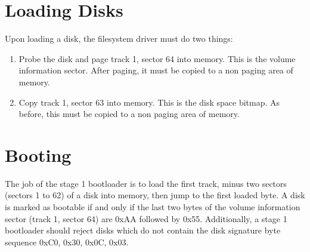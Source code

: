 \documentclass{article}
\begin{document}
\section{Loading Disks}

Upon loading a disk, the filesystem driver must do two things:

\begin{enumerate}
    \item Probe the disk and page track 1, sector 64 into memory. This is the volume information sector.
        After paging, it must be copied to a non paging area of memory.
    \item Copy track 1, sector 63 into memory. This is the disk space bitmap.
        As before, this must be copied to a non paging area of memory.
\end{enumerate}

\section{Booting}

The job of the stage 1 bootloader is to load the first track, minus two sectors (sectors 1 to 62) of a disk into memory, then jump to the first loaded byte.
A disk is marked as bootable if and only if the last two bytes of the volume information sector (track 1, sector 64) are 0xAA followed by 0x55. Additionally, a stage 1 bootloader should
reject disks which do not contain the disk signature byte sequence 0xC0, 0x30, 0x0C, 0x03.
\end{document}
